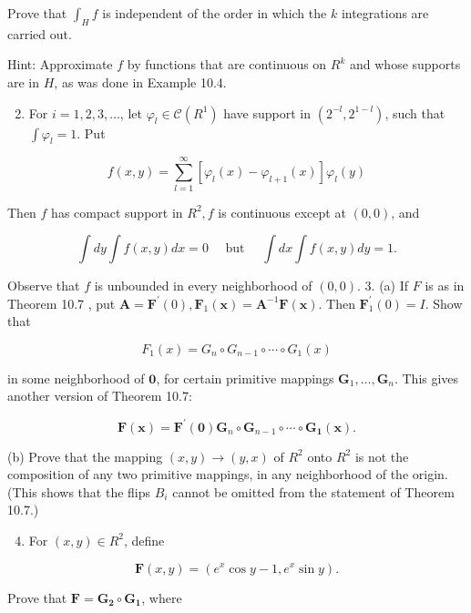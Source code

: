 \documentclass[10pt]{article}
\begin{document}
Prove that $\int_{H} f$ is independent of the order in which the $k$ integrations are carried out.

Hint: Approximate $f$ by functions that are continuous on $R^{k}$ and whose supports are in $H$, as was done in Example 10.4.

\begin{enumerate}
  \setcounter{enumi}{1}
  \item For $i=1,2,3, \ldots$, let $\varphi_{l} \in \mathscr{C}\left(R^{1}\right)$ have support in $\left(2^{-l}, 2^{1-l}\right)$, such that $\int \varphi_{l}=1$. Put
\end{enumerate}

$$
f(x, y)=\sum_{l=1}^{\infty}\left[\varphi_{l}(x)-\varphi_{l+1}(x)\right] \varphi_{l}(y)
$$

Then $f$ has compact support in $R^{2}, f$ is continuous except at $(0,0)$, and

$$
\int d y \int f(x, y) d x=0 \quad \text { but } \quad \int d x \int f(x, y) d y=1 .
$$

Observe that $f$ is unbounded in every neighborhood of $(0,0)$. 3. (a) If $F$ is as in Theorem 10.7 , put $\mathbf{A}=\mathbf{F}^{\prime}(0), \mathbf{F}_{1}(\mathbf{x})=\mathbf{A}^{-1} \mathbf{F}(\mathbf{x})$. Then $\mathbf{F}_{1}^{\prime}(0)=I$. Show that

$$
F_{1}(x)=G_{n} \circ G_{n-1} \circ \cdots \circ G_{1}(x)
$$

in some neighborhood of $\mathbf{0}$, for certain primitive mappings $\mathbf{G}_{1}, \ldots, \mathbf{G}_{n}$. This gives another version of Theorem 10.7:

$$
\mathbf{F}(\mathbf{x})=\mathbf{F}^{\prime}(\mathbf{0}) \mathbf{G}_{n} \circ \mathbf{G}_{n-1} \circ \cdots \circ \mathbf{G}_{\mathbf{1}}(\mathbf{x}) .
$$

(b) Prove that the mapping $(x, y) \rightarrow(y, x)$ of $R^{2}$ onto $R^{2}$ is not the composition of any two primitive mappings, in any neighborhood of the origin. (This shows that the flips $B_{i}$ cannot be omitted from the statement of Theorem 10.7.)

\begin{enumerate}
  \setcounter{enumi}{3}
  \item For $(x, y) \in R^{2}$, define
\end{enumerate}

$$
\mathbf{F}(x, y)=\left(e^{x} \cos y-1, e^{x} \sin y\right) .
$$

Prove that $\mathbf{F}=\mathbf{G}_{\mathbf{2}} \circ \mathbf{G}_{\mathbf{1}}$, where
\end{document}
